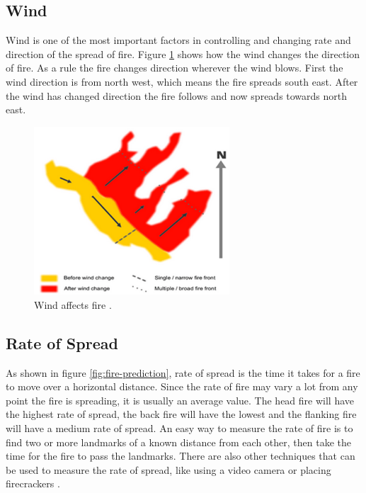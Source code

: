 \subsection{Wind}
Wind is one of the most important factors in controlling and changing rate and direction of the spread of fire. Figure \ref{fig:fire-wind} shows how the wind changes the direction of fire. As a rule the fire changes direction wherever the wind blows. First the wind direction is from north west, which means the fire spreads south east. After the wind has changed direction the fire follows and now spreads towards north east.
\begin{figure}[here]
  \centering
      \includegraphics[width=0.65\textwidth]{theory/graphics/fire-wind.png}
  \caption{Wind affects fire \cite{fireweather}.}
  \label{fig:fire-wind}
\end{figure}

\subsection{Rate of Spread}
As shown in figure \ref{fig:fire-prediction}, rate of spread is the time it takes for a fire to move over a horizontal distance. Since the rate of fire may vary a lot from any point the fire is spreading, it is usually an average value. The head fire will have the highest rate of spread, the back fire will have the lowest and the flanking fire will have a medium rate of spread. An easy way to measure the rate of fire is to find two or more landmarks of a known distance from each other, then take the time for the fire to pass the landmarks. There are also other techniques that can be used to measure the rate of spread, like using a video camera or placing firecrackers \cite{rateofspread}.


